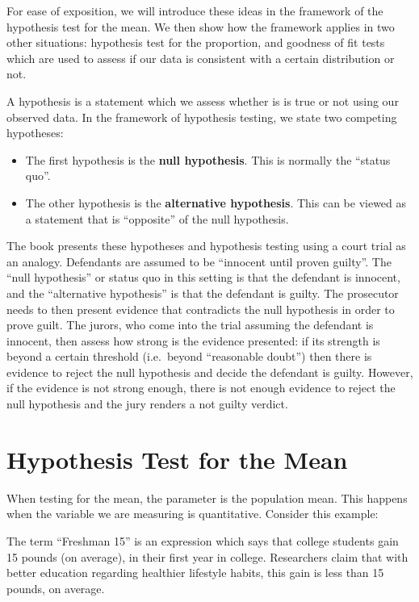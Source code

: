 \documentclass[
]{book}
\begin{document}
For ease of exposition, we will introduce these ideas in the framework of the hypothesis test for the mean. We then show how the framework applies in two other situations: hypothesis test for the proportion, and goodness of fit tests which are used to assess if our data is consistent with a certain distribution or not.

A hypothesis is a statement which we assess whether is is true or not using our observed data. In the framework of hypothesis testing, we state two competing hypotheses:

\begin{itemize}
\item
  The first hypothesis is the \textbf{null hypothesis}. This is normally the ``status quo''.
\item
  The other hypothesis is the \textbf{alternative hypothesis}. This can be viewed as a statement that is ``opposite'' of the null hypothesis.
\end{itemize}

The book presents these hypotheses and hypothesis testing using a court trial as an analogy. Defendants are assumed to be ``innocent until proven guilty''. The ``null hypothesis'' or status quo in this setting is that the defendant is innocent, and the ``alternative hypothesis'' is that the defendant is guilty. The prosecutor needs to then present evidence that contradicts the null hypothesis in order to prove guilt. The jurors, who come into the trial assuming the defendant is innocent, then assess how strong is the evidence presented: if its strength is beyond a certain threshold (i.e.~beyond ``reasonable doubt'') then there is evidence to reject the null hypothesis and decide the defendant is guilty. However, if the evidence is not strong enough, there is not enough evidence to reject the null hypothesis and the jury renders a not guilty verdict.

\section{Hypothesis Test for the Mean}\label{hypothesis-test-for-the-mean}

When testing for the mean, the parameter is the population mean. This happens when the variable we are measuring is quantitative. Consider this example:

The term ``Freshman 15'' is an expression which says that college students gain 15 pounds (on average), in their first year in college. Researchers claim that with better education regarding healthier lifestyle habits, this gain is less than 15 pounds, on average.
\end{document}
